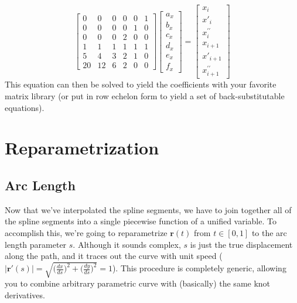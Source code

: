 \documentclass{article}
\newcommand{\norm}[1]{\lvert #1 \rvert}
\begin{document}
\[
\begin{bmatrix}
    0 & 0 & 0 & 0 & 0 & 1 \\[4pt]
    0 & 0 & 0 & 0 & 1 & 0 \\[4pt]
    0 & 0 & 0 & 2 & 0 & 0 \\[4pt]
    1 & 1 & 1 & 1 & 1 & 1 \\[4pt]
    5 & 4 & 3 & 2 & 1 & 0 \\[4pt]
    20 & 12 & 6 & 2 & 0 & 0
\end{bmatrix}
\begin{bmatrix}
    a_x \\[4pt]
    b_x \\[4pt]
    c_x \\[4pt]
    d_x \\[4pt]
    e_x \\[4pt]
    f_x
\end{bmatrix}
=
\begin{bmatrix}
    x_i \\[4pt]
    x'_i \\[4pt]
    x^{\prime\prime}_i \\[4pt]
    x_{i+1} \\[4pt]
    x'_{i+1} \\[4pt]
    x^{\prime\prime}_{i+1}
\end{bmatrix}
\]
This equation can then be solved to yield the coefficients with your favorite matrix library (or put in row echelon form to yield a set of back-substitutable equations).

\section{Reparametrization}

\subsection{Arc Length}
Now that we've interpolated the spline segments, we have to join together all of the spline segments into a single piecewise function of a unified variable. To accomplish this, we're going to reparametrize $\mathbf{r}(t)$ from $t \in [0, 1]$ to the arc length parameter $s$. Although it sounds complex, $s$ is just the true displacement along the path, and it traces out the curve with unit speed ($\norm{\mathbf{r}'(s)} = \sqrt{\big(\frac{dx}{ds}\big)^2 + \big(\frac{dy}{ds}\big)^2} = 1$). This procedure is completely generic, allowing you to combine arbitrary parametric curve with (basically) the same knot derivatives.
\end{document}
